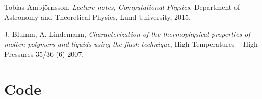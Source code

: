 \documentclass[a4paper,12pt]{article}
\theoremstyle{plain}
\theoremstyle{definition}
\begin{document}
\newpage

\begin{thebibliography}{99}
      Tobias Ambjörnsson,
     \emph{Lecture notes, Computational Physics},
     Department of Astronomy and Theoretical Physics,
     Lund University,
     2015.
 
      J. Blumm, A. Lindemann,
      \emph{Characterization of the thermophysical properties of molten polymers
      and liquids using the flash technique},
      High Temperatures -- High Pressures 35/36 (6)
      2007.

\end{thebibliography}
\newpage
\appendix
\section{Code}
   \label{sec:code}
   
\end{document}
